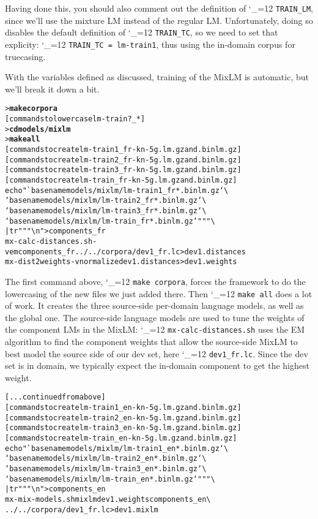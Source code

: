 \documentclass[11pt,letterpaper]{article}
\newcommand{\bs}{\textbackslash{}}
\def\code{\begingroup\catcode`\_=12 \codex}
\newcommand{\codex}[1]{\texttt{#1}\endgroup}
\begin{document}
Having done this, you should also comment out the definition of
\code{TRAIN_LM}, since we'll use the mixture LM instead of the regular LM.
Unfortunately, doing so disables the default definition of \code{TRAIN_TC}, so
we need to set that explicity: \code{TRAIN_TC = lm-train1}, thus using the
in-domain corpus for truecasing.

With the variables defined as discussed, training of the MixLM is automatic,
but we'll break it down a bit.
\begin{small}
\begin{alltt}
   > \textbf{make corpora}
   [commands to lowercase lm-train?_*]
   > \textbf{cd models/mixlm}
   > \textbf{make all}
   [commands to create lm-train1_fr-kn-5g.lm.gz and .binlm.gz]
   [commands to create lm-train2_fr-kn-5g.lm.gz and .binlm.gz]
   [commands to create lm-train3_fr-kn-5g.lm.gz and .binlm.gz]
   [commands to create lm-train_fr-kn-5g.lm.gz and .binlm.gz]
   echo "`basename models/mixlm/lm-train1_fr*.binlm.gz` \bs
         `basename models/mixlm/lm-train2_fr*.binlm.gz` \bs
         `basename models/mixlm/lm-train3_fr*.binlm.gz` \bs
         `basename models/mixlm/lm-train_fr*.binlm.gz`" "" \bs
      | tr " " "\bs{}n" > components_fr
   mx-calc-distances.sh -v em components_fr ../../corpora/dev1_fr.lc > dev1.distances
   mx-dist2weights -v normalize dev1.distances > dev1.weights
\end{alltt}
\end{small}

The first command above, \code{make corpora}, forces the framework to do the
lowercasing of the new files we just added there.  Then \code{make all} does a
lot of work.  It creates the three source-side per-domain language models, as
well as the global one.  The source-side language models are used to tune the
weights of the component LMs in the MixLM: \code{mx-calc-distances.sh} uses the
EM algorithm to find the component weights that allow the source-side MixLM to
best model the source side of our dev set, here \code{dev1_fr.lc}.  Since the
dev set is in domain, we typically expect the in-domain component to get the
highest weight.

\begin{small}
\begin{alltt}
   [... continued from above]
   [commands to create lm-train1_en-kn-5g.lm.gz and .binlm.gz]
   [commands to create lm-train2_en-kn-5g.lm.gz and .binlm.gz]
   [commands to create lm-train3_en-kn-5g.lm.gz and .binlm.gz]
   [commands to create lm-train_en-kn-5g.lm.gz and .binlm.gz]
   echo "`basename models/mixlm/lm-train1_en*.binlm.gz` \bs
         `basename models/mixlm/lm-train2_en*.binlm.gz` \bs
         `basename models/mixlm/lm-train3_en*.binlm.gz` \bs
         `basename models/mixlm/lm-train_en*.binlm.gz`" "" \bs
      | tr " " "\bs{}n" > components_en
   mx-mix-models.sh mixlm dev1.weights components_en \bs
      ../../corpora/dev1_fr.lc > dev1.mixlm
\end{alltt}
\end{small}
\end{document}
